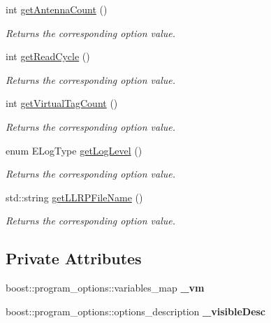 \begin{DoxyCompactItemize}
int \hyperlink{class_e_l_f_i_n_1_1_program_options_ad8d1d9804bb6c51518f6bb5359d62a8d}{get\-Antenna\-Count} ()
\begin{DoxyCompactList}\small\item\em Returns the corresponding option value. \end{DoxyCompactList}\item 
int \hyperlink{class_e_l_f_i_n_1_1_program_options_a3dcacd2989ebed87eee66765b4133b51}{get\-Read\-Cycle} ()
\begin{DoxyCompactList}\small\item\em Returns the corresponding option value. \end{DoxyCompactList}\item 
int \hyperlink{class_e_l_f_i_n_1_1_program_options_adf1a0c270f3eda0ef0b589c4f765963f}{get\-Virtual\-Tag\-Count} ()
\begin{DoxyCompactList}\small\item\em Returns the corresponding option value. \end{DoxyCompactList}\item 
enum E\-Log\-Type \hyperlink{class_e_l_f_i_n_1_1_program_options_a25118270b4fb86ca2bc98ef9996ce847}{get\-Log\-Level} ()
\begin{DoxyCompactList}\small\item\em Returns the corresponding option value. \end{DoxyCompactList}\item 
std\-::string \hyperlink{class_e_l_f_i_n_1_1_program_options_adbd9e9656083dcf06a0a2b99afab33b7}{get\-L\-L\-R\-P\-File\-Name} ()
\begin{DoxyCompactList}\small\item\em Returns the corresponding option value. \end{DoxyCompactList}\end{DoxyCompactItemize}

\subsection*{Private Attributes}
\begin{DoxyCompactItemize}
\item 
\hypertarget{class_e_l_f_i_n_1_1_program_options_a634928958af27c5c61bec63b1c322ed7}{boost\-::program\-\_\-options\-::variables\-\_\-map {\bfseries \-\_\-vm}}\label{class_e_l_f_i_n_1_1_program_options_a634928958af27c5c61bec63b1c322ed7}

\item 
\hypertarget{class_e_l_f_i_n_1_1_program_options_a61846db95193a0bfac31cbc959b85c5a}{boost\-::program\-\_\-options\-::options\-\_\-description {\bfseries \-\_\-visible\-Desc}}\label{class_e_l_f_i_n_1_1_program_options_a61846db95193a0bfac31cbc959b85c5a}

\end{DoxyCompactItemize}


